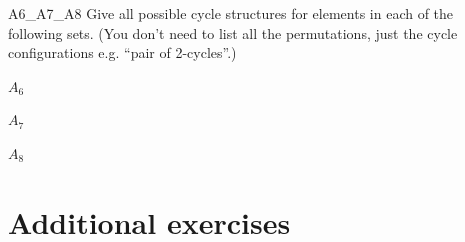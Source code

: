 \begin{exercise}{A6_A7_A8}
Give all possible cycle structures for elements in each of the following sets. (You don't need to list all the permutations, just the cycle configurations e.g. ``pair of 2-cycles''.)
\begin{enumerate}[(a)]
\begin{multicols}{3}
\item
$A_6$
\item
$A_7$
\item
$A_8$
\end{multicols}
\end{enumerate}
\end{exercise}


\section{Additional exercises}
\label{sec:Permutations:AdditionalExercises}
 
